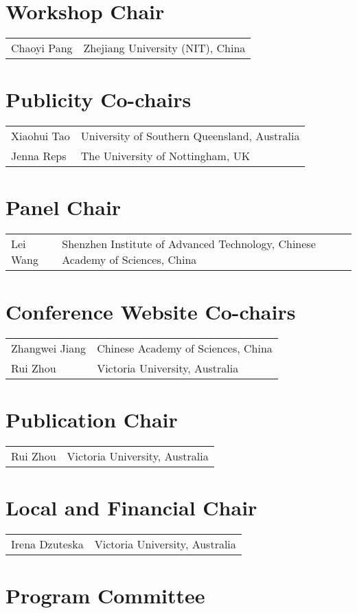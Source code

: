 \documentclass{llncs}
\begin{document}
\section*{Workshop Chair}
\begin{tabular}{@{}p{5cm}@{}p{7.2cm}@{}}
Chaoyi Pang & Zhejiang University (NIT), China
\end{tabular}
%
\section*{Publicity Co-chairs}
\begin{tabular}{@{}p{5cm}@{}p{7.2cm}@{}}
Xiaohui Tao & University of Southern Queensland, Australia\\
Jenna Reps & The University of Nottingham, UK
\end{tabular}
%
\section*{Panel Chair}
\begin{tabular}{@{}p{5cm}@{}p{7.2cm}@{}}
Lei Wang & Shenzhen Institute of Advanced Technology, \hfil\break  Chinese Academy of Sciences, China
\end{tabular}
%
\section*{Conference Website Co-chairs}
\begin{tabular}{@{}p{5cm}@{}p{7.2cm}@{}}
Zhangwei Jiang & Chinese Academy of Sciences, China \\
Rui Zhou & Victoria University, Australia
\end{tabular}
%
\section*{Publication Chair}
\begin{tabular}{@{}p{5cm}@{}p{7.2cm}@{}}
Rui Zhou & Victoria University, Australia
\end{tabular}
%

%
\section*{Local and Financial Chair}
\begin{tabular}{@{}p{5cm}@{}p{7.2cm}@{}}
Irena Dzuteska & Victoria University, Australia
\end{tabular}
%

%
%
\section*{Program Committee}
\end{document}
